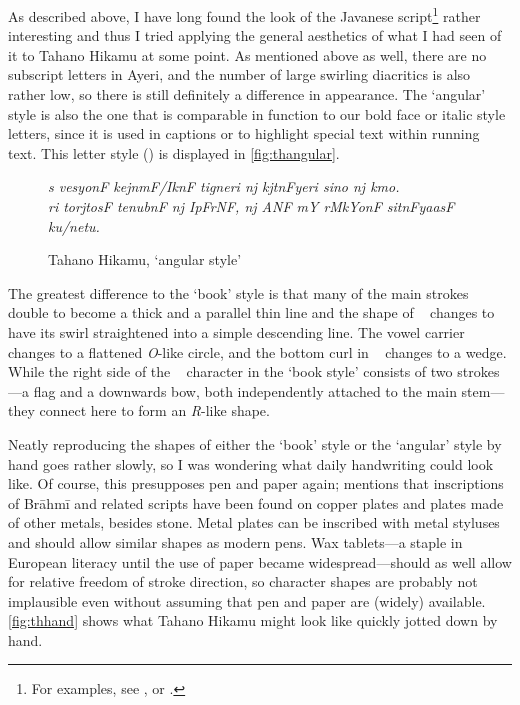 As described above, I have long found the look of the Javanese 
script\footnote{For examples, see \citet{everson2008}, or .} 
rather interesting and thus I tried applying the general aesthetics of what I 
had seen of it to Tahano Hikamu at some point. As mentioned above as well, 
there are no subscript letters in Ayeri, and the number of large swirling 
diacritics is also rather low, so there is still definitely a difference in 
appearance. The `angular' style is also the one that is comparable in function 
to our bold face or italic style letters, since it is used in captions or to 
highlight special text within running text. This letter style 
() is displayed in \autoref{fig:thangular}. 

\begin{figure}[ht]\centering
\caption{Tahano Hikamu, `angular style'}
{\Tagati\itshape\Large s vesyonF kejnmF/IknF tigneri nj kjtnFyeri sino nj kmo.\\
ri torjtosF tenubnF nj IpFrNF, nj ANF mY rMkYonF sitnFyaasF ku/netu.}
\label{fig:thangular}
\end{figure}

The greatest difference to the `book' style is that many of the main strokes 
double to become a thick and a parallel thin line and the shape of 
~ changes to have its swirl straightened into a simple 
descending line. The vowel carrier  changes to a flattened 
\textit{O}-like circle, and the bottom curl in ~ changes to a 
wedge. While the right side of the ~ character in the `book 
style' consists of two strokes---a flag and a downwards bow, both 
independently attached to the main stem---they connect here to form an 
\emph{R}-like shape.

 Neatly reproducing the shapes of
either the `book' style or the `angular' style by hand goes rather slowly, so I
was wondering what daily handwriting could look like. Of course, this
presupposes pen and paper again; \citet[377]{salomon1996} mentions that
inscriptions of Brāhmī and related scripts have been found on copper plates and
plates made of other metals, besides stone. Metal plates can be inscribed with
metal styluses and should allow similar shapes as modern pens. Wax tablets---a
staple in European literacy until the use of paper became widespread---should
as well allow for relative freedom of stroke direction, so character shapes
are probably not implausible even without assuming that pen and paper are
(widely) available.
\autoref{fig:thhand} shows what Tahano Hikamu might look like quickly jotted 
down by hand.

